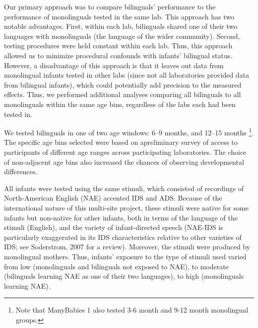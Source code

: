 \documentclass[
  english,
  ,man,floatsintext]{apa6}
\begin{document}
Our primary approach was to compare bilinguals' performance to the performance of monolinguals tested in the same lab. This approach has two notable advantages. First, within each lab, bilinguals shared one of their two languages with monolinguals (the language of the wider community). Second, testing procedures were held constant within each lab. Thus, this approach allowed us to minimize procedural confounds with infants' bilingual status. However, a disadvantage of this approach is that it leaves out data from monolingual infants tested in other labs (since not all laboratories provided data from bilingual infants), which could potentially add precision to the measured effects. Thus, we performed additional analyses comparing all bilinguals to all monolinguals within the same age bins, regardless of the labs each had been tested in.

We tested bilinguals in one of two age windows: 6--9 months, and 12--15 months \footnote{Note that ManyBabies 1 also tested 3-6 month and 9-12 month monolingual groups.}. The specific age bins selected were based on apreliminary survey of access to participants of different age ranges across participating laboratories. The choice of non-adjacent age bins also increased the chances of observing developmental differences.

All infants were tested using the same stimuli, which consisted of recordings of North-American English (NAE) accented IDS and ADS. Because of the international nature of this multi-site project, these stimuli were native for some infants but non-native for other infants, both in terms of the language of the stimuli (English), and the variety of infant-directed speech (NAE-IDS is particularly exaggerated in its IDS characteristics relative to other varieties of IDS; see Soderstrom, 2007 for a review). Moreover, the stimuli were produced by monolingual mothers. Thus, infants' exposure to the type of stimuli used varied from low (monolinguals and bilinguals not exposed to NAE), to moderate (bilinguals learning NAE as one of their two languages), to high (monolinguals learning NAE).
\end{document}
